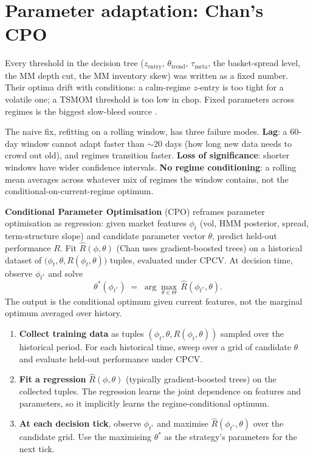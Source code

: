 \section{Parameter adaptation: Chan's CPO}
\label{sec:wsw_cpo}

Every threshold in the decision tree
($z_{\text{entry}}$, $\theta_{\text{trend}}$,
$\tau_{\text{meta}}$, the basket-spread level, the MM depth cut,
the MM inventory skew) was written as a fixed number. Their optima
drift with conditions: a calm-regime $z$-entry is too tight for a
volatile one; a TSMOM threshold is too low in chop. Fixed
parameters across regimes is the biggest slow-bleed source
\citeChanQT{}.

The naive fix, refitting on a rolling window, has three failure
modes. \textbf{Lag}: a 60-day window cannot adapt faster than
$\sim 20$ days (how long new data needs to crowd out old), and
regimes transition faster. \textbf{Loss of significance}: shorter
windows have wider confidence intervals. \textbf{No regime
conditioning}: a rolling mean averages across whatever mix of
regimes the window contains, not the conditional-on-current-regime
optimum.

\textbf{Conditional Parameter Optimisation} (CPO)
\citep{chan2020cpo} reframes parameter optimisation as regression:
given market features $\phi_t$ (vol, HMM posterior, spread,
term-structure slope) and candidate parameter vector $\theta$,
predict held-out performance $R$. Fit $\hat{R}(\phi, \theta)$
(Chan uses gradient-boosted trees) on a historical dataset of
$\big(\phi_t, \theta, R(\phi_t, \theta)\big)$ tuples, evaluated
under CPCV. At decision time, observe $\phi_{t^*}$ and solve
\begin{equation}
  \theta^{*}(\phi_{t^*})
  \;=\;
  \arg\max_{\theta \in \Theta}\,
  \hat{R}(\phi_{t^*}, \theta).
  \label{eq:wsw_cpo}
\end{equation}
The output is the conditional optimum given current features, not
the marginal optimum averaged over history.

\begin{keyfactbox}
\begin{enumerate}
  \item \textbf{Collect training data} as tuples
  $(\phi_t, \theta, R(\phi_t, \theta))$ sampled over the
  historical period. For each historical time, sweep over a
  grid of candidate $\theta$ and evaluate held-out performance
  under CPCV.
  \item \textbf{Fit a regression} $\hat{R}(\phi, \theta)$
  (typically gradient-boosted trees) on the collected
  tuples. The regression learns the joint dependence on
  features and parameters, so it implicitly learns the
  regime-conditional optimum.
  \item \textbf{At each decision tick}, observe $\phi_{t^*}$
  and maximise $\hat{R}(\phi_{t^*}, \theta)$ over the
  candidate grid. Use the maximising $\theta^{*}$ as the
  strategy's parameters for the next tick.
\end{enumerate}
\end{keyfactbox}

